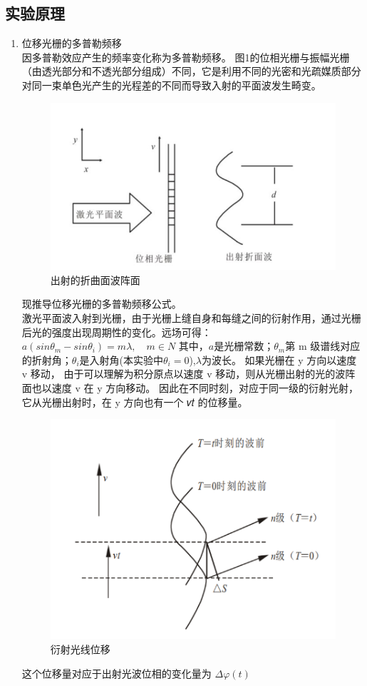 \documentclass[dvipsnames, svgnames,a4paper,11pt]{article}
\begin{document}
	\subsection{实验原理}
	\begin{enumerate}
		\item 位移光栅的多普勒频移\\
		因多普勒效应产生的频率变化称为多普勒频移。 图1的位相光栅与振幅光栅（由透光部分和不透光部分组成）不同，它是利用不同的光密和光疏媒质部分对同一束单色光产生的光程差的不同而导致入射的平面波发生畸变。
		\begin{figure}[H]
			\centering
			\includegraphics[width=0.5\linewidth]{images/出射的折曲面波阵面}
			\caption{出射的折曲面波阵面}
			\label{fig:出射的折曲面波阵面}
		\end{figure}
		现推导位移光栅的多普勒频移公式。\\
		激光平面波入射到光栅，由于光栅上缝自身和每缝之间的衍射作用，通过光栅后光的强度出现周期性的变化。远场可得：$a(sin\theta_m-sin\theta_i)=m\lambda,\quad m\in N$
		其中，$a$是光栅常数；$\theta_m$第 m 级谱线对应的折射角；$\theta_i$是入射角(本实验中$\theta_i=0$),$\lambda$为波长。
		如果光栅在 y 方向以速度 v 移动， 由于可以理解为积分原点以速度 v 移动，则从光栅出射的光的波阵面也以速度 v 在 y 方向移动。 因此在不同时刻，对应于同一级的衍射光射，它从光栅出射时，在 y 方向也有一个 𝑣𝑡 的位移量。
		\begin{figure}[H]
			\centering
			\includegraphics[width=0.5\linewidth]{images/衍射光线位移量}
			\caption{衍射光线位移}
			\label{衍射光线位移}
		\end{figure}
		这个位移量对应于出射光波位相的变化量为 $\Delta\varphi(t)$
		

\end{enumerate}
\end{document}

